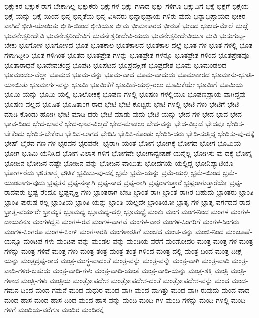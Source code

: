 {ಭಿಕ್ಷುಕರ
ಭಿಕ್ಷುಕ-ರಾಗ-ಬೇಕಾಗಿಲ್ಲ
ಭಿಕ್ಷುಕರು
ಭಿಕ್ಷುಗಳ
ಭಿಕ್ಷು-ಗಳಾದ
ಭಿಕ್ಷು-ಗಳಿಗೂ
ಭಿಕ್ಷುವಿಗೆ
ಭಿಕ್ಷೆ
ಭಿಕ್ಷೆಗೆ
ಭಿಕ್ಷೆಯ
ಭಿಕ್ಷೆ-ಯನ್ನು
ಭಿಕ್ಷೆ-ಯಿಂದ
ಭಿನ್ನ
ಭಿನ್ನತೆಯ
ಭಿನ್ನ-ವಿಸಿದರು
ಭಿನ್ನಾಭಿಪ್ರಾಯ-ಗಳಿರು-ವುದು
ಭಿನ್ನಾಭಿಪ್ರಾಯದ
ಭೀಕರ-ವಾಗಿದೆ
ಭೀತಿ-ಯಾಯಿತು
ಭೀತಿ-ಯಿಂದ
ಭೀತಿಯೂ
ಭೀಮ
ಭೀಮಾಕಾರದ
ಭೀರುತೆ
ಭುಜದ
ಭುಜದ-ಮೇಲೆ
ಭುಜ್ಗೆ
ಭುವನೇಶ್ವರೀದೇವಿ
ಭುವನೇಶ್ವರೀದೇವಿಗೆ
ಭುವನೇಶ್ವರೀದೇವಿ-ಯದು
ಭುವನೇಶ್ವರೀದೇವಿಯೂ
ಭುವಿ
ಭುಸುಗುಟ್ಟ-ಬೇಕು
ಭೂಗೋಳ
ಭೂಗೋಳದ
ಭೂತ
ಭೂತಕಾಲ
ಭೂತಕಾಲದ
ಭೂತಕಾಲ-ದಲ್ಲೆ
ಭೂತ-ಗಳ
ಭೂತ-ಗಳಲ್ಲಿ
ಭೂತ-ಗಳಾಗಿದ್ದೀರಿ
ಭೂತ-ಗಳಿಗಿಂತ
ಭೂತದ
ಭೂತಪ್ರೇತ-ಗಳನ್ನು
ಭೂತಪ್ರೇತ-ಗಳನ್ನೂ
ಭೂತಪ್ರೇತ-ಗಳಿಂದ
ಭೂತಪ್ರೇತವೂ
ಭೂತಾರಾಧನೆ
ಭೂದೇವಚಂದ್ರ
ಭೂಪಟ
ಭೂಪಟದ
ಭೂಪ್ರದಕ್ಷಿಣೆ
ಭೂಪ್ರದೇಶ
ಭೂಮ
ಭೂಮಂಡಲದ
ಭೂಮಂಡಲ-ವೆಲ್ಲಾ
ಭೂಮದ
ಭೂಮ-ವನ್ನು
ಭೂಮ-ವಾದ
ಭೂಮ-ವಾದುದು
ಭೂಮಾಕಾರದ
ಭೂಮಾನು-ಭೂತಿ-ಯಾಯಿತು
ಭೂಮಾರ್ಗ-ವನ್ನು
ಭೂಮಿ
ಭೂಮಿಕೆಗೆ
ಭೂಮಿಕೆ-ಯಲ್ಲಿ-ರಲು
ಭೂಮಿಕೆಯೇ
ಭೂಮಿಗೆ
ಭೂಮಿಯ
ಭೂಮಿ-ಯನ್ನು
ಭೂಮಿ-ಯಲ್ಲಿ
ಭೂಲೋಕಕ್ಕೆ
ಭೂಷಣ-ಗಳಲ್ಲಿ
ಭೂಷಣ-ಗಳಲ್ಲಿಯೂ
ಭೂಷಣಪ್ರಾಯ-ವಾಗಿದ್ದವು
ಭೂಷಣ-ವಲ್ಲದ
ಭೂಷಿತ
ಭೂಷಿತಾಂಗ-ರಾದ
ಭೇಟಿ
ಭೇಟಿ-ಕೊಟ್ಟರು
ಭೇಟಿ-ಗಳಲ್ಲಿ
ಭೇಟಿ-ಗಳು
ಭೇಟಿಗೆ
ಭೇಟಿ-ಮಾಡಿ-ಕೊಂಡು-ಹೋಗಿ
ಭೇಟಿ-ಮಾಡಿ-ದರು
ಭೇಟಿ-ಮಾಡು-ವುದು
ಭೇಟಿ-ಯನ್ನು
ಭೇದ-ಗಳ
ಭೇದ-ಭಾವ
ಭೇದ-ಭಾವ-ದಿಂದ
ಭೇದ-ಭಾವನೆ
ಭೇದ-ಭಾವ-ವಿಲ್ಲದೆ
ಭೇದ-ಮಾಡಲು
ಭೇದ-ವನ್ನು
ಭೇದ-ವಿಲ್ಲದೆ
ಭೇದವೂ
ಭೇದಿಸ-ಬೇಕೆಂದು
ಭೇದಿಸ-ಬೇಕೆಂಬ
ಭೇದಿಸ-ಲಾಗದ
ಭೇದಿಸಿ
ಭೇದಿಸಿ-ಕೊಂಡು
ಭೇದಿಸಿ-ದರು
ಭೇದಿ-ಸುತ್ತಿದ್ದ
ಭೇದಿಸು-ವು-ದಕ್ಕೆ
ಭೇಷ್
ಭೈರವ-ಗಣ-ಗಳ
ಭೈರವನ
ಭೈರವನೇ-
ಭೈರಾಗಿ-ಯಂತೆ
ಭೋಗ
ಭೋಗಕ್ಕೆ
ಭೋಗದ
ಭೋಗ-ಭೂಮಿಯ
ಭೋಗ-ಭೂಮಿ-ಯೆನಿಸಿದ
ಭೋಗ-ವಿಲಾಸ-ಗಳಿಗೆ
ಭೋಗವೇ
ಭೋಗಾನ್ವೇಷಣೆ-ಯನ್ನೆಲ್ಲ
ಭೋಗಿಸು-ವು-ದಕ್ಕೆ
ಭೋಗ್ಯ
ಭೋಜನ
ಭೋಜನ-ದಷ್ಟೇ
ಭೋಜನ-ವನ್ನು
ಭೋಜನ-ವಾಯಿತು
ಭೋದಗಯೆ-ಯಲ್ಲಿದ್ದ
ಭೋನಿಪ್ಯಾಟಿಯೊ
ಭೋರ್ಗರೆದು
ಭೌತಶಾಸ್ತ್ರ
ಭೌತಿಕ
ಭ್ರಮಿಸು-ವು-ದಕ್ಕೆ
ಭ್ರಮೆ
ಭ್ರಮೆ-ಯನ್ನು
ಭ್ರಮೆ-ಯಲ್ಲಿ
ಭ್ರಮೆ-ಯಿಂದ
ಭ್ರಮೆ-ಯುಂಟಾಗು-ವುದು
ಭ್ರಷ್ಟತನ
ಭ್ರಷ್ಟ-ನನ್ನಾಗಿ
ಭ್ರಷ್ಟ-ನಾದ
ಭ್ರಷ್ಟ-ರಾಗಿ
ಭ್ರಷ್ಟರಾಗುತ್ತಾರೆ
ಭ್ರಷ್ಟರಾಗುತ್ತಾರೆಯೇ
ಭ್ರಷ್ಟ-ರಾದವರು
ಭ್ರಷ್ಟ-ರೆಂದೂ
ಭ್ರಷ್ಟವೃಕ್ತಿ-ಗಳು
ಭ್ರಾಂತರಾಗ-ಬೇಡಿ
ಭ್ರಾಂತ-ರಾಗಿ
ಭ್ರಾಂತ-ರಾಗಿರ-ಬಹುದು
ಭ್ರಾಂತರು
ಭ್ರಾಂತಿ
ಭ್ರಾಂತಿ-ಪುರುಷ-ರಲ್ಲ
ಭ್ರಾಂತಿಯ
ಭ್ರಾಂತಿ-ಯನ್ನು
ಭ್ರಾಂತಿ-ಯಲ್ಲದೇ
ಭ್ರಾಂತಿಯೋ
ಭ್ರಾತೃ-ಗಳ
ಭ್ರಾತೃ-ವರ್ಗದವ-ರಾದ
ಭ್ರಾತೃ-ವರ್ಯರೇ
ಭ್ರಾಮ್ಯಕ
ಭ್ರೂಮಧ್ಯ
ಭ್ರೂಮಧ್ಯ-ದಲ್ಲಿ
ಭ್ರೂಮಧ್ಯೆ
ಮಂಕು
ಮಂಗ
ಮಂಗ-ನಿಂದ
ಮಂಗಳ
ಮಂಗಳ-ದಾಯಕನೂ
ಮಂಗಳಧ್ವನಿ
ಮಂಗಳ-ರವ
ಮಂಗಳ-ವಾಗವೆ
ಮಂಗಳ-ವಾರ
ಮಂಗಳ-ಸಿಂಗರಿಗೆ
ಮಂಗಳ-ಸಿಂಗರು
ಮಂಗಳ-ಸಿಂಗರೂ
ಮಂಗಳ-ಸಿಂಗ್
ಮಂಗಳಾರತಿ
ಮಂಗಳಾರತಿಗೆ
ಮಂಚದ
ಮಂಚ-ವನ್ನು
ಮಂಜಿ-ನಿಂದ
ಮಂಜೂಷೆ-ಯನ್ನೂ
ಮಂಟಪ-ಗಳು
ಮಂಟಪ-ವನ್ನು
ಮಂಡಲ-ವನ್ನು
ಮಂಡಿಯ-ವರೆಗೆ
ಮಂಡೋದರಿ
ಮಂತ್ರ
ಮಂತ್ರ-ಗಳ
ಮಂತ್ರ-ಗಳನ್ನು
ಮಂತ್ರ-ಗಳಿವೆ
ಮಂತ್ರ-ಗಳು
ಮಂತ್ರ-ತಂತ್ರ
ಮಂತ್ರ-ತಂತ್ರ-ಗಳಿಂದ
ಮಂತ್ರ-ದಲ್ಲಿ
ಮಂತ್ರ-ದಿಂದ
ಮಂತ್ರ-ದೀಕ್ಷೆ-ಯನ್ನು
ಮಂತ್ರದ್ರಷ್ಟ-ರಾದ
ಮಂತ್ರ-ಮುಗ್ಧ-ವಾದಂತೆ
ಮಂತ್ರ-ವನ್ನು
ಮಂತ್ರ-ವನ್ನೇ
ಮಂತ್ರ-ವಾಗಿ
ಮಂತ್ರ-ವಾದಿ
ಮಂತ್ರ-ವಾದಿ-ಗಳಿರ-ಬಹುದು
ಮಂತ್ರ-ವಾದಿ-ಗಳು
ಮಂತ್ರ-ವಾದಿ-ಯಂತೆ
ಮಂತ್ರ-ವಾದಿ-ಯನ್ನು
ಮಂತ್ರ-ಶಕ್ತಿ
ಮಂತ್ರಿ
ಮಂತ್ರಿ-ಗಳಾದ
ಮಂತ್ರಿ-ಗಳು
ಮಂತ್ರಿಯ
ಮಂತ್ರೋಪದೇಶ
ಮಂತ್ರೋಪದೇಶ-ದಂತೆ
ಮಂತ್ರೋಪದೇಶ-ವನ್ನು
ಮಂದ
ಮಂದ-ಗಮನ-ದಿಂದ
ಮಂದ-ಗಮನೆ
ಮಂದ-ಮಧುರ
ಮಂದ-ವಾಗಿ
ಮಂದ-ವಾಗಿತ್ತು
ಮಂದ-ವಾಗಿ-ರುವುದು
ಮಂದ-ವಾದ
ಮಂದ-ಹಾಸ
ಮಂದ-ಹಾಸ-ದಿಂದ
ಮಂದ-ಹಾಸ-ವನ್ನು
ಮಂದಿ
ಮಂದಿ-ಗಳ
ಮಂದಿ-ಗಳನ್ನು
ಮಂದಿ-ಗಳಲ್ಲಿ
ಮಂದಿ-ಗಳಿಗೆ
ಮಂದಿಯ-ವರೆಗೂ
ಮಂದಿರ
ಮಂದಿರಕ್ಕೆ
}
